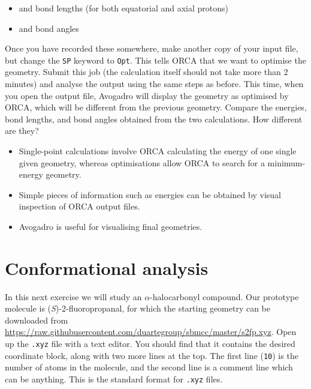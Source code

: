 \documentclass[10pt]{article}
\begin{document}
\begin{itemize}
    \item {} and  bond lengths (for both equatorial and axial protons)
    \item {} and  bond angles
\end{itemize}

Once you have recorded these somewhere, make another copy of your input file, but change the \texttt{SP} keyword to \texttt{Opt}. This tells ORCA that we want to optimise the geometry. Submit this job (the calculation itself should not take more than 2 minutes) and analyse the output using the same steps as before. This time, when you open the output file, Avogadro will display the geometry as optimised by ORCA, which will be different from the previous geometry. Compare the energies, bond lengths, and bond angles obtained from the two calculations. How different are they?

\begin{summary}
    \begin{itemize}[leftmargin=0.6cm]
        \item Single-point calculations involve ORCA calculating the energy of one single given geometry, whereas optimisations allow ORCA to search for a minimum-energy geometry.
        \item Simple pieces of information such as energies can be obtained by visual inspection of ORCA output files.
        \item Avogadro is useful for visualising final geometries.
    \end{itemize}
\end{summary}


\section{Conformational analysis}

In this next exercise we will study an \(\alpha\)-halocarbonyl compound. Our prototype molecule is (\textit{S})-2-fluoropropanal, for which the starting geometry can be downloaded from \url{https://raw.githubusercontent.com/duartegroup/sbmcc/master/s2fp.xyz}. Open up the \texttt{.xyz} file with a text editor. You should find that it contains the desired coordinate block, along with two more lines at the top. The first line (\texttt{10}) is the number of atoms in the molecule, and the second line is a comment line which can be anything. This is the standard format for \texttt{.xyz} files.
\end{document}
